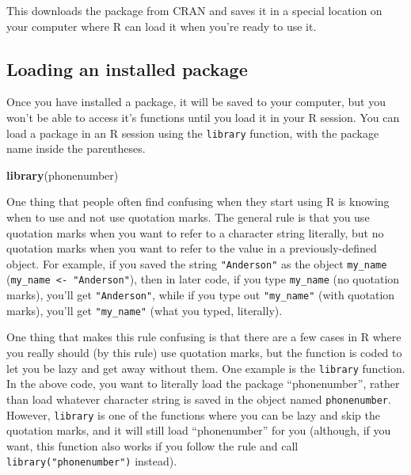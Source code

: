 \documentclass[]{book}
\makeatletter
\newenvironment{Shaded}{\begin{snugshade}}{\end{snugshade}}
\newcommand{\KeywordTok}[1]{\textcolor[rgb]{0.13,0.29,0.53}{\textbf{{#1}}}}
\newcommand{\NormalTok}[1]{{#1}}
\newenvironment{kframe}{%
\medskip{}
\setlength{\fboxsep}{.8em}
 \def\at@end@of@kframe{}%
 \ifinner\ifhmode%
  \def\at@end@of@kframe{\end{minipage}}%
  \begin{minipage}{\columnwidth}%
 \fi\fi%
 \def\FrameCommand##1{\hskip\@totalleftmargin \hskip-\fboxsep
 \colorbox{shadecolor}{##1}\hskip-\fboxsep
     \hskip-\linewidth \hskip-\@totalleftmargin \hskip\columnwidth}%
 \MakeFramed {\advance\hsize-\width
   \@totalleftmargin\z@ \linewidth\hsize
   \@setminipage}}%
 {\par\unskip\endMakeFramed%
 \at@end@of@kframe}
\renewenvironment{Shaded}{\begin{kframe}}{\end{kframe}}
\newenvironment{rmdblock}[1]
  {
  \begin{itemize}
  \renewcommand{\labelitemi}{
    \raisebox{-.7\height}[0pt][0pt]{
      {\setkeys{Gin}{width=3em,keepaspectratio}\texttt{[image: images/\#1]}}
    }
  }
  \setlength{\fboxsep}{1em}
  \begin{kframe}
  \item
  }
  {
  \end{kframe}
  \end{itemize}
  }
\newenvironment{rmdtip}
  {\begin{rmdblock}{tip}}
  {\end{rmdblock}}
\makeatother
\begin{document}
This downloads the package from CRAN and saves it in a special location
on your computer where R can load it when you're ready to use it.

\subsection{Loading an installed
package}\label{loading-an-installed-package}

Once you have installed a package, it will be saved to your computer,
but you won't be able to access it's functions until you load it in your
R session. You can load a package in an R session using the
\texttt{library} function, with the package name inside the parentheses.

\begin{Shaded}
\begin{Highlighting}[]
\KeywordTok{library}\NormalTok{(phonenumber)}
\end{Highlighting}
\end{Shaded}

\begin{rmdtip}
One thing that people often find confusing when they start using R is
knowing when to use and not use quotation marks. The general rule is
that you use quotation marks when you want to refer to a character
string literally, but no quotation marks when you want to refer to the
value in a previously-defined object. For example, if you saved the
string \texttt{"Anderson"} as the object \texttt{my\_name}
(\texttt{my\_name\ \textless{}-\ "Anderson"}), then in later code, if
you type \texttt{my\_name} (no quotation marks), you'll get
\texttt{"Anderson"}, while if you type out \texttt{"my\_name"} (with
quotation marks), you'll get \texttt{"my\_name"} (what you typed,
literally).

One thing that makes this rule confusing is that there are a few cases
in R where you really should (by this rule) use quotation marks, but the
function is coded to let you be lazy and get away without them. One
example is the \texttt{library} function. In the above code, you want to
literally load the package ``phonenumber'', rather than load whatever
character string is saved in the object named \texttt{phonenumber}.
However, \texttt{library} is one of the functions where you can be lazy
and skip the quotation marks, and it will still load ``phonenumber'' for
you (although, if you want, this function also works if you follow the
rule and call \texttt{library("phonenumber")} instead).
\end{rmdtip}
\end{document}

